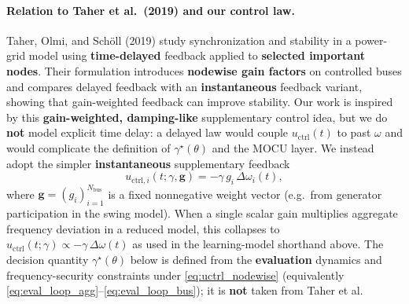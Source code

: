 \documentclass[10pt]{article}
\begin{document}
\paragraph{Relation to Taher et al.\ (2019) and our control law.}
\label{sec:taher_motivation}
Taher, Olmi, and Schöll (2019) study synchronization and stability in a power-grid model using \textbf{time-delayed} feedback applied to \textbf{selected important nodes}. Their formulation introduces \textbf{nodewise gain factors} on controlled buses and compares delayed feedback with an \textbf{instantaneous} feedback variant, showing that gain-weighted feedback can improve stability. Our work is inspired by this \textbf{gain-weighted, damping-like} supplementary control idea, but we do \textbf{not} model explicit time delay: a delayed law would couple $u_{\mathrm{ctrl}}(t)$ to past $\omega$ and would complicate the definition of $\gamma^\star(\theta)$ and the MOCU layer. We instead adopt the simpler \textbf{instantaneous} supplementary feedback
\begin{equation}
\label{eq:uctrl_nodewise}
u_{\mathrm{ctrl},i}(t;\gamma,\mathbf g)=-\gamma\, g_i\,\Delta\omega_i(t),
\end{equation}
where $\mathbf g=(g_i)_{i=1}^{N_{\mathrm{bus}}}$ is a fixed nonnegative weight vector (e.g.\ from generator participation in the swing model). When a single scalar gain multiplies aggregate frequency deviation in a reduced model, this collapses to $u_{\mathrm{ctrl}}(t;\gamma)\propto -\gamma\,\Delta\omega(t)$ as used in the learning-model shorthand above. The decision quantity $\gamma^\star(\theta)$ below is defined from the \textbf{evaluation} dynamics and frequency-security constraints under \eqref{eq:uctrl_nodewise} (equivalently \eqref{eq:eval_loop_agg}--\eqref{eq:eval_loop_bus}); it is \textbf{not} taken from Taher et al.
\end{document}
